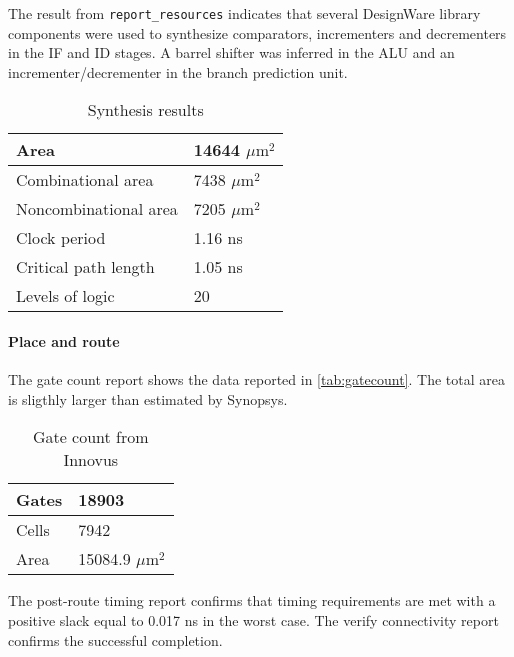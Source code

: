 The result from \texttt{report\_resources} indicates that several DesignWare library components were used to synthesize comparators, incrementers and decrementers in the IF and ID stages. A barrel shifter was inferred in the ALU and an incrementer/decrementer in the branch prediction unit.

\begin{table}[h]
	\centering
	\begin{tabular}{|l|l|}
		\hline
		Area & 14644 $\mu\textrm{m}^2$\\\hline
		Combinational area & 7438 $\mu\textrm{m}^2$\\\hline
		Noncombinational area &7205 $\mu\textrm{m}^2$\\\hline
		Clock period & 1.16 ns \\\hline
		Critical path length & 1.05 ns\\\hline
		Levels of logic & 20 \\\hline

	\end{tabular}
\caption{Synthesis results}
\label{tab:synres}
\end{table}

\paragraph{Place and route} The gate count report shows the data reported in \autoref{tab:gatecount}. The total area is sligthly larger than estimated by Synopsys.
\begin{table}[h]
	\centering
	\begin{tabular}{|l|l|}\hline
  Gates &     18903\\\hline Cells &   7942\\\hline Area &   15084.9 $\mu\textrm{m}^2$\\\hline
	\end{tabular}
	\caption{Gate count from Innovus}
	\label{tab:gatecount}
\end{table}

The post-route timing report confirms that timing requirements are met with a positive slack equal to 0.017 ns in the worst case. The verify connectivity report confirms the successful completion.

